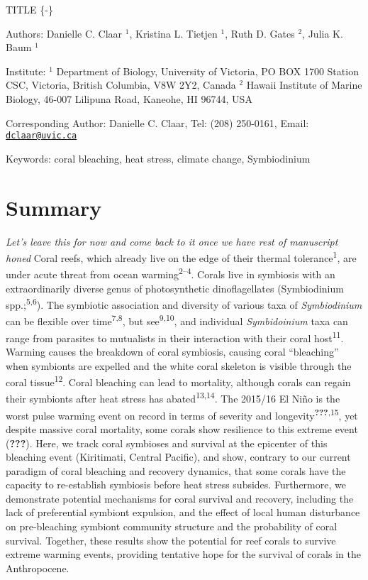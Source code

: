 \documentclass[]{article}
\title{}
\author{}
\date{}
\begin{document}
\pagebreak

TITLE \{-\}

Authors: Danielle C. Claar \(^1\), Kristina L. Tietjen \(^1\), Ruth D.
Gates \(^2\), Julia K. Baum \(^1\)

Institute: \(^1\) Department of Biology, University of Victoria, PO BOX
1700 Station CSC, Victoria, British Columbia, V8W 2Y2, Canada \(^2\)
Hawaii Institute of Marine Biology, 46-007 Lilipuna Road, Kaneohe, HI
96744, USA

Corresponding Author: Danielle C. Claar, Tel: (208) 250-0161, Email:
\href{mailto:dclaar@uvic.ca}{\nolinkurl{dclaar@uvic.ca}}

Keywords: coral bleaching, heat stress, climate change, Symbiodinium

\pagebreak 

\section*{Summary}\label{summary}

\emph{Let's leave this for now and come back to it once we have rest of
manuscript honed} Coral reefs, which already live on the edge of their
thermal tolerance\textsuperscript{1}, are under acute threat from ocean
warming\textsuperscript{2--4}. Corals live in symbiosis with an
extraordinarily diverse genus of photosynthetic dinoflagellates
(Symbiodinium spp.;\textsuperscript{5,6}). The symbiotic association and
diversity of various taxa of \emph{Symbiodinium} can be flexible over
time\textsuperscript{7,8}, but see\textsuperscript{9,10}, and individual
\emph{Symbidoinium} taxa can range from parasites to mutualists in their
interaction with their coral host\textsuperscript{11}. Warming causes
the breakdown of coral symbiosis, causing coral ``bleaching'' when
symbionts are expelled and the white coral skeleton is visible through
the coral tissue\textsuperscript{12}. Coral bleaching can lead to
mortality, although corals can regain their symbionts after heat stress
has abated\textsuperscript{13,14}. The 2015/16 El Niño is the worst
pulse warming event on record in terms of severity and
longevity\textsuperscript{{\textbf{???}},15}, yet despite massive coral
mortality, some corals show resilience to this extreme event
(\textbf{???}). Here, we track coral symbioses and survival at the
epicenter of this bleaching event (Kiritimati, Central Pacific), and
show, contrary to our current paradigm of coral bleaching and recovery
dynamics, that some corals have the capacity to re-establish symbiosis
before heat stress subsides. Furthermore, we demonstrate potential
mechanisms for coral survival and recovery, including the lack of
preferential symbiont expulsion, and the effect of local human
disturbance on pre-bleaching symbiont community structure and the
probability of coral survival. Together, these results show the
potential for reef corals to survive extreme warming events, providing
tentative hope for the survival of corals in the Anthropocene.
\end{document}
